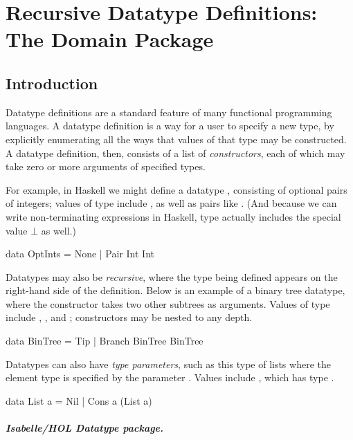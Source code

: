 \chapter{Recursive Datatype Definitions: The Domain Package}
\label{ch:domain}

\section{Introduction}

Datatype definitions are a standard feature of many functional programming languages. A datatype definition is a way for a user to specify a new type, by explicitly enumerating all the ways that values of that type may be constructed. A datatype definition, then, consists of a list of \emph{constructors}, each of which may take zero or more arguments of specified types.

For example, in Haskell we might define a datatype , consisting of optional pairs of integers; values of type  include , as well as pairs like . (And because we can write non-terminating expressions in Haskell, type  actually includes the special value $\bot$ as well.)
%
\begin{hscode}
data OptInts = None | Pair Int Int
\end{hscode}
%
Datatypes may also be \emph{recursive}, where the type being defined appears on the right-hand side of the definition. Below is an example of a binary tree datatype, where the  constructor takes two other subtrees as arguments. Values of type  include , , and ;  constructors may be nested to any depth.
%
\begin{hscode}
data BinTree = Tip | Branch BinTree BinTree
\end{hscode}
%
Datatypes can also have \emph{type parameters}, such as this type of lists where the element type is specified by the parameter . Values include , which has type .
%
\begin{hscode}
data List a = Nil | Cons a (List a)
\end{hscode}

\paragraph{Isabelle/HOL Datatype package.}


